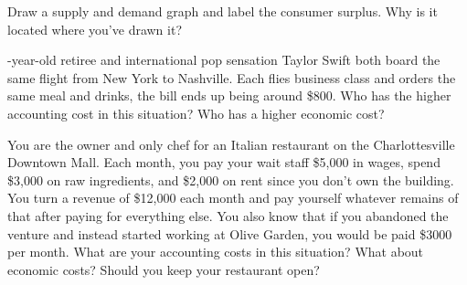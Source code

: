 \documentclass{exam}
\begin{document}
\begin{questions}
\question
Draw a supply and demand graph and label the consumer surplus. Why is it located where you’ve drawn it?

-year-old retiree and international pop sensation Taylor Swift both board the same flight from New York to Nashville. Each flies business class and orders the same meal and drinks, the bill ends up being around \$800. Who has the higher accounting cost in this situation? Who has a higher economic cost?

\question
You are the owner and only chef for an Italian restaurant on the Charlottesville Downtown Mall. Each month, you pay your wait staff \$5,000 in wages, spend \$3,000 on raw ingredients, and \$2,000 on rent since you don’t own the building. You turn a revenue of \$12,000 each month and pay yourself whatever remains of that after paying for everything else. You also know that if you abandoned the venture and instead started working at Olive Garden, you would be paid \$3000 per month. What are your accounting costs in this situation? What about economic costs? Should you keep your restaurant open?


\end{questions}
\end{document}
